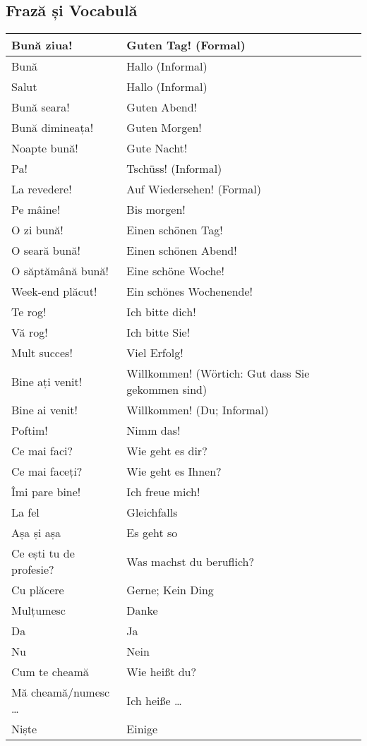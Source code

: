 \documentclass[11pt, oneside]{article}
\begin{document}
\subsection{Frază și Vocabulă}
\begin{center}
  \begin{tabular}{ | l | l | } 
    \hline
    Bună ziua! & Guten Tag! (Formal)\\ 
    \hline
    Bună & Hallo (Informal)\\ 
    \hline
    Salut & Hallo (Informal)\\ 
    \hline
    Bună seara! & Guten Abend!\\
    \hline
    Bună dimineața! & Guten Morgen!\\
    \hline
    Noapte bună! & Gute Nacht!\\
    \hline
    Pa! & Tschüss! (Informal)\\
    \hline
    La revedere! & Auf Wiedersehen! (Formal)\\
    \hline
    Pe mâine! & Bis morgen!\\
    \hline
    O zi bună! & Einen schönen Tag!\\
    \hline
    O seară bună! & Einen schönen Abend!\\
    \hline
    O săptămână bună! & Eine schöne Woche!\\
    \hline
    Week-end plăcut! & Ein schönes Wochenende!\\
    \hline
    Te rog! & Ich bitte dich!\\
    \hline
    Vă rog! & Ich bitte Sie!\\
    \hline
    Mult succes! & Viel Erfolg!\\
    \hline
    Bine ați venit! & Willkommen! (Wörtich: Gut dass Sie gekommen sind)\\
    \hline
    Bine ai venit! & Willkommen! (Du; Informal)\\
    \hline
    Poftim! & Nimm das!\\
    \hline
    Ce mai faci? & Wie geht es dir?\\
    \hline
    Ce mai faceți? & Wie geht es Ihnen?\\
    \hline
    Îmi pare bine! & Ich freue mich!\\
    \hline
    La fel & Gleichfalls\\
    \hline
    Așa și așa & Es geht so\\
    \hline 
    Ce ești tu de profesie? & Was machst du beruflich?\\
    \hline
    Cu plăcere & Gerne; Kein Ding\\
    \hline
    Mulțumesc & Danke\\
    \hline
    Da & Ja\\
    \hline
    Nu & Nein\\
    \hline
    Cum te cheamă & Wie heißt du?\\
    \hline
    Mă cheamă/numesc \dots & Ich heiße \dots\\
    \hline
    Niște & Einige\\
    \hline
  \end{tabular}
\end{center}
\pagebreak
%
%
\end{document}
